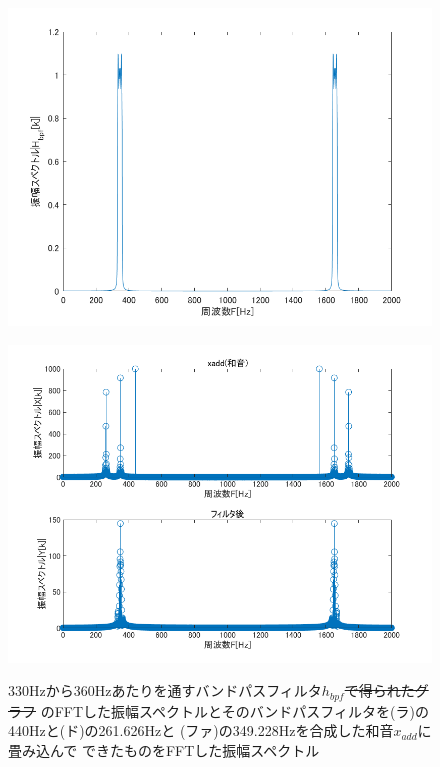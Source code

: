 \documentclass[11pt, a4paper, titlepage]{ltjsarticle}
\begin{document}
\begin{figure}[h]
    \begin{center}
    \begin{minipage}[t]{0.48\columnwidth}
        \includegraphics[width=\columnwidth]{figures/2-4bpf.png}
        \label{fign:2-4bpf}
    \end{minipage}
    \begin{minipage}[t]{0.48\columnwidth}
        \includegraphics[width=\columnwidth]{figures/2-4yb.png}
        \label{fign:2-4yb}
    \end{minipage}
    \end{center}
    \caption{330Hzから360Hzあたりを通すバンドパスフィルタ$h_{bpf}$\sout{で得られたグラフ}
    のFFTした振幅スペクトルとそのバンドパスフィルタを(ラ)の440Hzと(ド)の261.626Hzと
    (ファ)の349.228Hzを合成した和音$x_{add}$に畳み込んで
    できたものをFFTした振幅スペクトル}
\end{figure}
\newpage
　
\newpage
\end{document}
